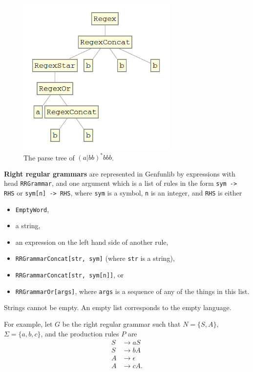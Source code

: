 \documentclass{article}
\theoremstyle{plain}
\newcommand{\codefont}[1]{{\fontshape{n}\texttt{#1}}}
\begin{document}
\begin{figure}
  \centerline{\includegraphics[width=300px]{regextree}}
\caption{The parse tree of \( (a|bb)^*bbb \). \label{fig:regextree}}
\end{figure}

\textbf{Right regular grammars} are represented in Genfunlib by expressions
with head
\codefont{RRGrammar}, and one argument which is a list of rules in the form
\codefont{sym -> RHS} or \codefont{sym[n] -> RHS}, where
\codefont{sym} is a symbol,
\codefont{n} is an integer, and
\codefont{RHS} is either
\begin{itemize}
    \item \codefont{EmptyWord},
    \item a string,
    \item an expression on the left hand side of another rule,
    \item \codefont{RRGrammarConcat[str, sym]} (where \codefont{str} is a
      string),
    \item \codefont{RRGrammarConcat[str, sym[n]]}, or
    \item \codefont{RRGrammarOr[args]}, where \codefont{args} is a sequence
      of any of the things in this list.
\end{itemize}
      Strings cannot be empty.
    An empty list corresponds to the empty language.

For example, let \( G \) be the right regular grammar such that
\(N = \{ S, A \} \), \( \Sigma = \{a, b, c\} \), and the production rules \(P\)
are
\begin{align*}
  S &\rightarrow aS\\
  S &\rightarrow bA\\
  A &\rightarrow \epsilon\\
  A &\rightarrow cA.
\end{align*}
\end{document}
